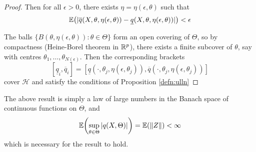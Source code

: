 \begin{proof}
  Then for all $\epsilon > 0$, there exists $\eta = \eta(\epsilon,
  \theta)$ such that
  \begin{equation}
    \label{eq:58}
    \E{|\overline q(X, \theta, \eta(\epsilon, \theta)) - \underline
      q(X, \theta, \eta(\epsilon, \theta))|} < \epsilon
  \end{equation}

  The balls $\{ B(\theta, \eta(\epsilon, \theta)) : \theta \in \Theta
  \}$ form an open covering of $\Theta$, so by compactness
  (Heine-Borel theorem in $\mathbb{R}^{p}$), there exists a finite subcover of
  $\theta$, say with centres $\theta_{1}, \dots,
  \theta_{N(\epsilon)}$.  Then the corresponding brackets
  \begin{equation}
    \label{eq:59}
    [\underline q_{i}, \overline q_{i}] = [ \underline q(\cdot,
    \theta_{j}, \eta(\epsilon, \theta_{j})), \overline q(\cdot,
    \theta_{j}, \eta(\epsilon, \theta_{j}))]
  \end{equation} cover $\mathcal{H}$ and satisfy the conditions of
  Proposition \ref{defn:ulln}
\end{proof}

\begin{remark}
  The above result is simply a law of large numbers in the Banach
  space of continuous functions on $\Theta$, and
  \begin{equation}
    \label{eq:60}
    \E{\sup_{\theta \in \Theta} | q(X, \Theta) |} = \E{\|Z\|} < \infty
  \end{equation} which is necessary for the result to hold.
\end{remark}





